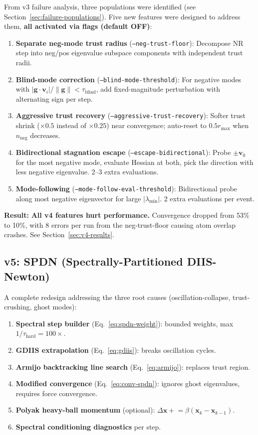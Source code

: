 \documentclass[11pt,a4paper]{article}
\newcommand{\vect}[1]{\mathbf{#1}}
\newcommand{\evec}{\vect{v}}
\newcommand{\eval}{\lambda}
\begin{document}
From v3 failure analysis, three populations were identified (see Section~\ref{sec:failure-populations}). Five new features were designed to address them, \textbf{all activated via flags (default OFF)}:

\begin{enumerate}
  \item \textbf{Separate neg-mode trust radius} (\texttt{--neg-trust-floor}): Decompose NR step into neg/pos eigenvalue subspace components with independent trust radii.
  \item \textbf{Blind-mode correction} (\texttt{--blind-mode-threshold}): For negative modes with $|\vect{g}\cdot\evec_i|/\|\vect{g}\| < \tau_\text{blind}$, add fixed-magnitude perturbation with alternating sign per step.
  \item \textbf{Aggressive trust recovery} (\texttt{--aggressive-trust-recovery}): Softer trust shrink ($\times 0.5$ instead of $\times 0.25$) near convergence; auto-reset to $0.5 r_\text{max}$ when $n_\text{neg}$ decreases.
  \item \textbf{Bidirectional stagnation escape} (\texttt{--escape-bidirectional}): Probe $\pm\evec_0$ for the most negative mode, evaluate Hessian at both, pick the direction with less negative eigenvalue. 2--3 extra evaluations.
  \item \textbf{Mode-following} (\texttt{--mode-follow-eval-threshold}): Bidirectional probe along most negative eigenvector for large $|\eval_\text{min}|$. 2 extra evaluations per event.
\end{enumerate}

\textbf{Result:} \textbf{All v4 features hurt performance.} Convergence dropped from 53\% to 10\%, with 8 errors per run from the neg-trust-floor causing atom overlap crashes. See Section~\ref{sec:v4-results}.

\subsection{v5: SPDN (Spectrally-Partitioned DIIS-Newton)}

A complete redesign addressing the three root causes (oscillation-collapse, trust-crushing, ghost modes):
\begin{enumerate}
  \item \textbf{Spectral step builder} (Eq.~\ref{eq:spdn-weight}): bounded weights, max $1/\tau_\text{hard} = 100\times$.
  \item \textbf{GDIIS extrapolation} (Eq.~\ref{eq:gdiis}): breaks oscillation cycles.
  \item \textbf{Armijo backtracking line search} (Eq.~\ref{eq:armijo}): replaces trust region.
  \item \textbf{Modified convergence} (Eq.~\ref{eq:conv-spdn}): ignores ghost eigenvalues, requires force convergence.
  \item \textbf{Polyak heavy-ball momentum} (optional): $\Delta\vect{x} \mathrel{+}= \beta(\vect{x}_k - \vect{x}_{k-1})$.
  \item \textbf{Spectral conditioning diagnostics} per step.
\end{enumerate}
\end{document}
